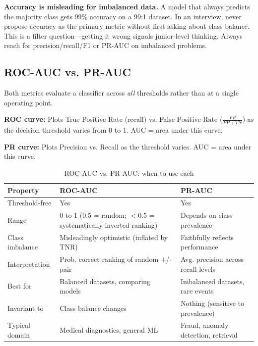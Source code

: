 \begin{warningbox}
\textbf{Accuracy is misleading for imbalanced data.} A model that always predicts the majority class gets 99\% accuracy on a 99:1 dataset. In an interview, never propose accuracy as the primary metric without first asking about class balance. This is a filter question---getting it wrong signals junior-level thinking. Always reach for precision/recall/F1 or PR-AUC on imbalanced problems.
\end{warningbox}

\subsection{ROC-AUC vs. PR-AUC}

Both metrics evaluate a classifier across \textit{all} thresholds rather than at a single operating point.

\textbf{ROC curve:} Plots True Positive Rate (recall) vs. False Positive Rate ($\frac{FP}{FP+TN}$) as the decision threshold varies from 0 to 1. AUC = area under this curve.

\textbf{PR curve:} Plots Precision vs. Recall as the threshold varies. AUC = area under this curve.

\begin{table}[H]
\centering
\caption{ROC-AUC vs. PR-AUC: when to use each}
\begin{tabularx}{\textwidth}{lXX}
\toprule
\textbf{Property} & \textbf{ROC-AUC} & \textbf{PR-AUC} \\
\midrule
Threshold-free & Yes & Yes \\
Range & 0 to 1 (0.5 = random; $<$0.5 = systematically inverted ranking) & Depends on class prevalence \\
Class imbalance & Misleadingly optimistic (inflated by TNR) & Faithfully reflects performance \\
Interpretation & Prob. correct ranking of random +/- pair & Avg. precision across recall levels \\
Best for & Balanced datasets, comparing models & Imbalanced datasets, rare events \\
Invariant to & Class balance changes & Nothing (sensitive to prevalence) \\
Typical domain & Medical diagnostics, general ML & Fraud, anomaly detection, retrieval \\
\bottomrule
\end{tabularx}
\end{table}

